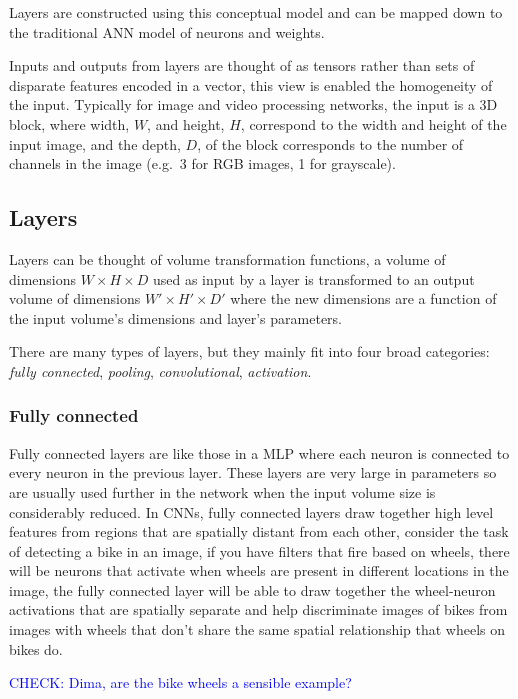 \documentclass[A4paper,draft]{scrreprt}
\begin{document}
Layers are constructed using this conceptual model and can be mapped
down to the traditional ANN model of neurons and weights.

Inputs and outputs from layers are thought of as tensors rather than
sets of disparate features encoded in a vector, this view is enabled the
homogeneity of the input. Typically for image and video processing
networks, the input is a 3D block, where width, \(W\), and height,
\(H\), correspond to the width and height of the input image, and the
depth, \(D\), of the block corresponds to the number of channels in the
image (e.g.~3 for RGB images, 1 for grayscale).

\subsection{Layers}\label{layers}

Layers can be thought of volume transformation functions, a volume of
dimensions \(W \times H \times D\) used as input by a layer is
transformed to an output volume of dimensions \(W' \times H' \times D'\)
where the new dimensions are a function of the input volume's dimensions
and layer's parameters.

There are many types of layers, but they mainly fit into four broad
categories: \emph{fully connected}, \emph{pooling},
\emph{convolutional}, \emph{activation}.

\subsubsection{Fully connected}\label{fully-connected}

Fully connected layers are like those in a MLP where each neuron is
connected to every neuron in the previous layer. These layers are very
large in parameters so are usually used further in the network when the
input volume size is considerably reduced. In CNNs, fully connected
layers draw together high level features from regions that are spatially
distant from each other, consider the task of detecting a bike in an
image, if you have filters that fire based on wheels, there will be
neurons that activate when wheels are present in different locations in
the image, the fully connected layer will be able to draw together the
wheel-neuron activations that are spatially separate and help
discriminate images of bikes from images with wheels that don't share
the same spatial relationship that wheels on bikes do.

\textcolor{blue}{CHECK: Dima, are the bike wheels a sensible example?}\newline
\end{document}
